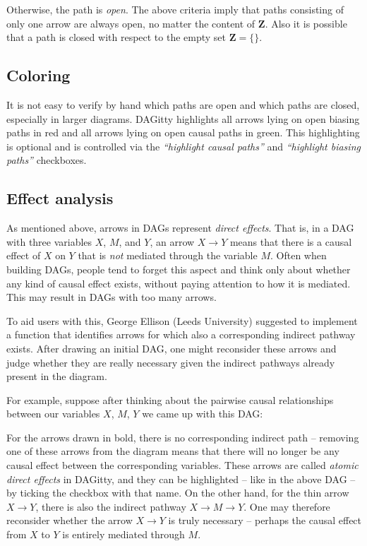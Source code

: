 \documentclass[a4paper]{article} %
\newcommand{\pp}{{\sc DAG}itty\xspace}
\newcommand{\action}[1]{\emph{``#1''}}
\begin{document}
Otherwise, the path is \emph{open}.
The above criteria imply that paths consisting of only one
arrow are always open, no matter the content of $\mathbf{Z}$. 
Also it is possible that a path is closed with respect
to the empty set $\mathbf{Z}=\{\}$.

\subsection{Coloring}

It is not easy to verify by hand which paths are open and
which paths are closed, especially in larger diagrams. 
\pp highlights all arrows lying on open 
biasing paths in red and all arrows lying on open
causal paths in green. This highlighting is optional 
and is controlled via 
the \action{highlight causal paths} and \action{highlight biasing paths}
checkboxes.

\subsection{Effect analysis}

As mentioned above, arrows in DAGs represent \emph{direct effects}. That is, in a DAG
with three variables $X$, $M$, and $Y$, an arrow $X \to Y$ means that there is a causal
effect of $X$ on $Y$ that is \emph{not} mediated through the variable $M$. 
Often when building DAGs, people tend to forget this aspect and think only about whether
any kind of causal effect exists, without paying attention to how it is mediated. This 
may result in DAGs with too many arrows. 

To aid users with this, George Ellison (Leeds University) suggested to implement a 
function that identifies arrows for which also a corresponding indirect pathway exists. 
After drawing an initial DAG, one might reconsider these arrows and judge whether they
are really necessary given the indirect pathways already present in the diagram.

For example, suppose after thinking about the pairwise causal relationships between
our variables $X$, $M$, $Y$ we came up with this DAG:


For the arrows drawn in bold, there is no corresponding indirect path -- removing
one of these arrows from the diagram means that there will no longer be any causal 
effect between the corresponding variables. These arrows are called \emph{atomic direct
effects} in \pp, and they can be highlighted -- like in the above DAG -- by ticking
the checkbox with that name. 
On the other hand, for the thin arrow 
$X \to Y$, there is also the indirect pathway $X \to M \to Y$. One may therefore reconsider
whether the arrow $X \to Y$ is truly necessary -- 
perhaps the causal effect from $X$ to $Y$ is entirely mediated through $M$.
\end{document}
